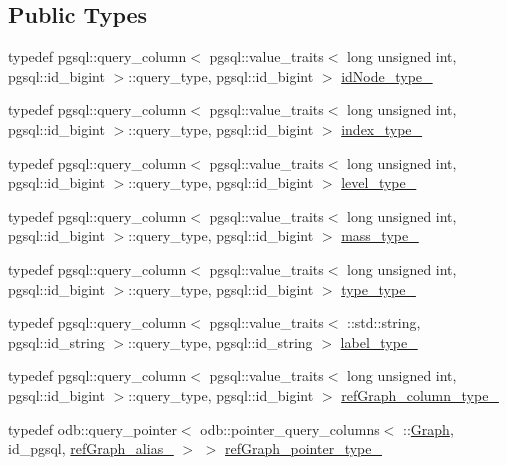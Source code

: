 \subsection*{Public Types}
\begin{DoxyCompactItemize}
\item 
typedef pgsql\+::query\+\_\+column$<$ pgsql\+::value\+\_\+traits$<$ long unsigned int, pgsql\+::id\+\_\+bigint $>$\+::query\+\_\+type, pgsql\+::id\+\_\+bigint $>$ \hyperlink{structodb_1_1query__columns_3_01_1_1_node_00_01id__pgsql_00_01_a_01_4_a46023ceac6e1a9642073db0b3a123053}{id\+Node\+\_\+type\+\_\+}
\item 
typedef pgsql\+::query\+\_\+column$<$ pgsql\+::value\+\_\+traits$<$ long unsigned int, pgsql\+::id\+\_\+bigint $>$\+::query\+\_\+type, pgsql\+::id\+\_\+bigint $>$ \hyperlink{structodb_1_1query__columns_3_01_1_1_node_00_01id__pgsql_00_01_a_01_4_a64592e84000ac1b60ab1a62f80fa55db}{index\+\_\+type\+\_\+}
\item 
typedef pgsql\+::query\+\_\+column$<$ pgsql\+::value\+\_\+traits$<$ long unsigned int, pgsql\+::id\+\_\+bigint $>$\+::query\+\_\+type, pgsql\+::id\+\_\+bigint $>$ \hyperlink{structodb_1_1query__columns_3_01_1_1_node_00_01id__pgsql_00_01_a_01_4_a23b6e7e1613f6c49d22ed865945c6325}{level\+\_\+type\+\_\+}
\item 
typedef pgsql\+::query\+\_\+column$<$ pgsql\+::value\+\_\+traits$<$ long unsigned int, pgsql\+::id\+\_\+bigint $>$\+::query\+\_\+type, pgsql\+::id\+\_\+bigint $>$ \hyperlink{structodb_1_1query__columns_3_01_1_1_node_00_01id__pgsql_00_01_a_01_4_aa2d823f900ade5bc0cd5bb6847e7e72c}{mass\+\_\+type\+\_\+}
\item 
typedef pgsql\+::query\+\_\+column$<$ pgsql\+::value\+\_\+traits$<$ long unsigned int, pgsql\+::id\+\_\+bigint $>$\+::query\+\_\+type, pgsql\+::id\+\_\+bigint $>$ \hyperlink{structodb_1_1query__columns_3_01_1_1_node_00_01id__pgsql_00_01_a_01_4_a60d79748387e6b960bfc9af6d5c367f6}{type\+\_\+type\+\_\+}
\item 
typedef pgsql\+::query\+\_\+column$<$ pgsql\+::value\+\_\+traits$<$ \+::std\+::string, pgsql\+::id\+\_\+string $>$\+::query\+\_\+type, pgsql\+::id\+\_\+string $>$ \hyperlink{structodb_1_1query__columns_3_01_1_1_node_00_01id__pgsql_00_01_a_01_4_a9bb2b1fcd94c969f5d18da731e83e972}{label\+\_\+type\+\_\+}
\item 
typedef pgsql\+::query\+\_\+column$<$ pgsql\+::value\+\_\+traits$<$ long unsigned int, pgsql\+::id\+\_\+bigint $>$\+::query\+\_\+type, pgsql\+::id\+\_\+bigint $>$ \hyperlink{structodb_1_1query__columns_3_01_1_1_node_00_01id__pgsql_00_01_a_01_4_a194b9a9f3e09f3fbfada9a59bc80ade3}{ref\+Graph\+\_\+column\+\_\+type\+\_\+}
\item 
typedef odb\+::query\+\_\+pointer$<$ odb\+::pointer\+\_\+query\+\_\+columns$<$ \+::\hyperlink{class_graph}{Graph}, id\+\_\+pgsql, \hyperlink{structodb_1_1query__columns__base_3_01_1_1_node_00_01id__pgsql_01_4_ab311bfd7c6def6fc3da77e3a2858ea38}{ref\+Graph\+\_\+alias\+\_\+} $>$ $>$ \hyperlink{structodb_1_1query__columns_3_01_1_1_node_00_01id__pgsql_00_01_a_01_4_aeee67984aa1be1821a4cd152bb3a86cf}{ref\+Graph\+\_\+pointer\+\_\+type\+\_\+}
\end{DoxyCompactItemize}
